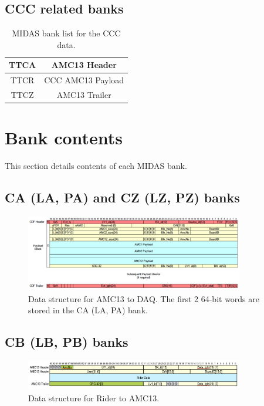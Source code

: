 {\subsection{CCC related banks}

\begin{table}[htbp]
\centering
\caption{MIDAS bank list for the CCC data.}
\begin{tabular}{|c|c|}
\hline 
TTCA & AMC13 Header \\
\hline
TTCR & CCC AMC13 Payload\\
\hline
TTCZ & AMC13 Trailer \\
\hline
\end{tabular} 
\end{table}


\section{Bank contents}

This section details contents of each MIDAS bank. 

\subsection*{CA (LA, PA) and CZ (LZ, PZ) banks}

\begin{figure}[htbp]
\centering
\includegraphics[width=0.85\textwidth]{pics/AMC13ToDAQ.pdf} 
\caption{Data structure for AMC13 to DAQ. The first 2 64-bit words are stored in the CA (LA, PA) bank.}\label{fig:AMC13ToDAQ}
\end{figure}

\subsection*{CB (LB, PB) banks}

\begin{figure}[htbp]
\centering
\includegraphics[width=0.85\textwidth]{pics/RiderToAMC13.pdf} 
\caption{Data structure for Rider to AMC13.}\label{fig:RiderToAMC13}
\end{figure}

}
